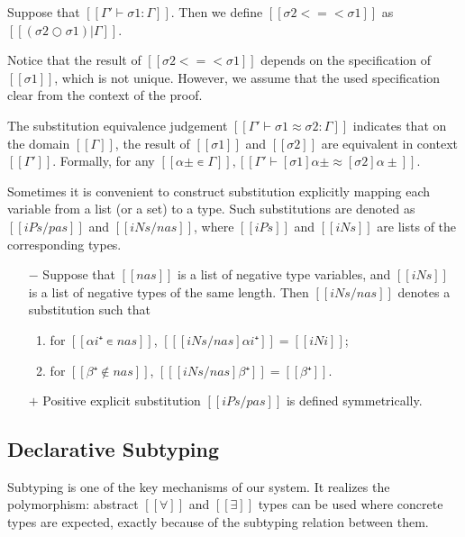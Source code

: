\documentclass[acmsmall,natbib=false,review,anonymous]{acmart}
\begin{document}
\begin{definition}
  Suppose that $[[Γ' ⊢ σ1 : Γ]]$.
  Then we define $[[σ2 <=< σ1]]$ as $[[(σ2 ○ σ1)|Γ]]$.
\end{definition}
Notice that the result of $[[σ2 <=< σ1]]$ depends on the 
specification of $[[σ1]]$, which is not unique. 
However, we assume that the used specification clear from the 
context of the proof. 

\begin{definition}
  The substitution equivalence judgement $[[Γ' ⊢ σ1 ≈ σ2 : Γ]]$ 
  indicates that on the domain $[[Γ]]$, 
  the result of $[[σ1]]$ and $[[σ2]]$ are equivalent in context $[[Γ']]$.
  Formally, for any $[[α± ∊ Γ]], [[ Γ' ⊢ [σ1]α± ≈ [σ2]α± ]]$.
\end{definition}

Sometimes it is convenient to construct substitution 
explicitly mapping each variable from a list (or a set)
to a type. Such substitutions are denoted as $[[iPs / pas]]$
and $[[iNs / nas]]$, where $[[iPs]]$ and $[[iNs]]$ are lists of 
the corresponding types.
\begin{definition}
  \hfill
  \begin{itemize}
    \item [$-$]
      Suppose that $[[nas]]$ is a list of negative type variables,
      and $[[iNs]]$ is a list of negative types of the same length.
      Then $[[iNs / nas]]$ denotes a substitution such that 
      \begin{enumerate}
        \item for $[[αi⁺ ∊ {nas}]]$, $[[ [iNs / nas] αi⁺]] = [[iNi]]$;
        \item for $[[β⁺ ∉ {nas}]]$, $[[ [iNs / nas] β⁺]] = [[β⁺]]$.
      \end{enumerate}
    \item [$+$]
      Positive explicit substitution $[[iPs / pas]]$
      is defined symmetrically.
  \end{itemize}
\end{definition}


\subsection{Declarative Subtyping}
Subtyping is one of the key mechanisms of our system. 
It realizes the polymorphism: abstract $[[∀]]$ and 
$[[∃]]$ types can be used where concrete types are expected,
exactly because of the subtyping relation between them.
\end{document}
